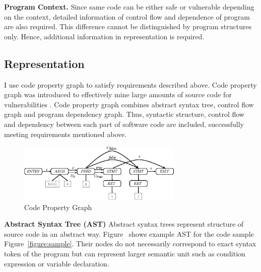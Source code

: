 \textbf{Program Context.} Since same code can be either safe or vulnerable depending on the context,
detailed information of control flow and dependence of program are also required.
This difference cannot be distinguished by program structures only. Hence, additional information in representation is required.

\subsection{Representation}
I use code property graph to satisfy requirements described above.
Code property graph was introduced to effectively mine large amounts of source code for vulnerabilities \cite{yamaguchi2014modeling}.
Code property graph combines abstract syntax tree, control flow graph and program dependency graph.
Thus, syntactic structure, control flow and dependency between each part of software code are included, successfully meeting requirements mentioned above.

\begin{figure}[ht]
	\centering
	\includegraphics[width=0.7\textwidth,height=0.65\textwidth,keepaspectratio]{./figure/cpg.eps}
	\caption{Code Property Graph}
	\label{figure:cpg}
\end{figure}

\textbf{Abstract Syntax Tree (AST)} Abstract syntax trees represent structure of source code in an abstract way.
Figure~ shows example AST for the code sample Figure~\ref{figure:sample}.
Their nodes do not necessarily correspond to exact syntax token of the program but can represent larger semantic unit such as condition expression or variable declaration.

